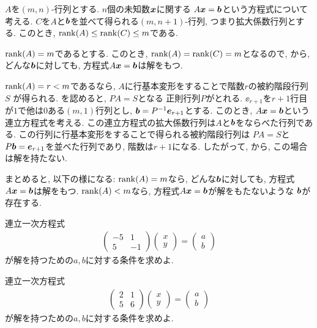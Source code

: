 \begin{remark}
  \label{rem:syslineq:rank:gen}
  $A$を$(m,n)$-行列とする.
  $n$個の未知数$\boldsymbol{x}$に関する
  $A\boldsymbol{x}=\boldsymbol{b}$という方程式について考える.
  $C$を$A$と$\boldsymbol{b}$を並べて得られる$(m,n+1)$-行列,
  つまり拡大係数行列とする.
  このとき, $\operatorname{rank}(A)\leq \operatorname{rank}(C)\leq m$である.

  $\operatorname{rank}(A)=m$であるとする.
  このとき,
  $\operatorname{rank}(A)=\operatorname{rank}(C)=m$となるので,  
  から,
  どんな$\boldsymbol{b}$に対しても, 
  方程式$A\boldsymbol{x}=\boldsymbol{b}$は解をもつ.

  $\operatorname{rank}(A)=r<m$であるなら,
  $A$に行基本変形をすることで階数$r$の被約階段行列$S$
  が得られる.
  を認めると,
  $PA=S$となる
  正則行列$P$がとれる.
  $\ee_{r+1}$を$r+1$行目が$1$で他は$0$ある$(m,1)$行列とし,
  $\boldsymbol{b}=P^{-1}\boldsymbol{e}_{r+1}$とする.
  このとき,
  $A\boldsymbol{x}=\boldsymbol{b}$という連立方程式を考える.
  この連立方程式の拡大係数行列は$A$と$\boldsymbol{b}$をならべた行列である.
  この行列に行基本変形をすることで得られる被約階段行列は
  $PA=S$と
  $P\boldsymbol{b}=\boldsymbol{e}_{r+1}$を並べた行列であり,
  階数は$r+1$になる.  したがって,
  から,
  この場合は解を持たない.

  まとめると, 以下の様になる:
$\operatorname{rank}(A)=m$なら,
  どんな$\boldsymbol{b}$に対しても, 
  方程式$A\boldsymbol{x}=\boldsymbol{b}$は解をもつ.
$\operatorname{rank}(A)<m$なら,
  方程式$A\boldsymbol{x}=\boldsymbol{b}$が解をもたないような
  $\boldsymbol{b}$が存在する.
\end{remark}


\begin{quiz}
  \label{quiz:3:4}
  連立一次方程式
  \begin{align*}
    \begin{pmatrix}-5&1\\5&-1\end{pmatrix}
    \begin{pmatrix}x\\y\end{pmatrix}
      =
      \begin{pmatrix}a\\b\end{pmatrix}
  \end{align*}
  が解を持つための$a,b$に対する条件を求めよ.
\end{quiz}

\begin{quiz}
  \label{quiz:3:4x}
  連立一次方程式
  \begin{align*}
    \begin{pmatrix}2&1\\5&6\end{pmatrix}
    \begin{pmatrix}x\\y\end{pmatrix}
      =
      \begin{pmatrix}a\\b\end{pmatrix}
  \end{align*}
  が解を持つための$a,b$に対する条件を求めよ.
\end{quiz}

